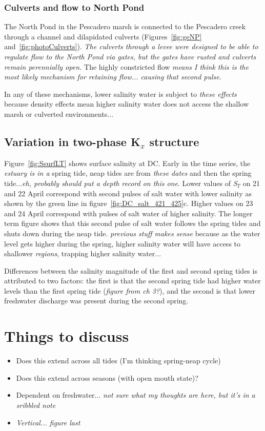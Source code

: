 \subsubsection{Culverts and flow to North Pond}
The North Pond in the Pescadero marsh is connected to the Pescadero creek through a channel and dilapidated culverts (Figures~\ref{fig:geNP} and~\ref{fig:photoCulverts}). \emph{The culverts through a levee were designed to be able to regulate flow to the North Pond via gates, but the gates have rusted and culverts remain perennially open.} The highly constricted flow \emph{means I think this is the most likely mechanism for retaining flow... causing that second pulse}.  

In any of these mechanisms, lower salinity water is subject to \emph{these effects} because density effects mean higher salinity water does not access the shallow marsh or culverted environments... 

\subsection{Variation in two-phase K$_x$ structure}
Figure~\ref{fig:SsurfLT} shows surface salinity at DC. Early in the time series, the \emph{estuary is in a} spring tide, neap tides are from \emph{these dates} and then the spring tide...\emph{eh, probably should put a depth record on this one}. Lower values of \emph{S$_T$} on 21 and 22 April correspond with second pulses of salt water with lower salinity as shown by the green line in figure~\ref{fig:DC_salt_421_425}c. Higher values on 23 and 24 April correspond with pulses of salt water of higher salinity. The longer term figure shows that this second pulse of salt water follows the spring tides and shuts down during the neap tide. \emph{previous stuff makes sense} because as the water level gets higher during the spring, higher salinity water will have access to shallower \emph{regions}, trapping higher salinity water... 

Differences between the salinity magnitude of the first and second spring tides is attributed to two factors: the first is that the second spring tide had higher water levels than the first spring tide (\emph{figure from ch 3?}), and the second is that lower freshwater discharge was present during the second spring. 


\section{Things to discuss}
\begin{itemize}
	\item Does this extend across all tides (I'm thinking spring-neap cycle)
	\item Does this extend across seasons (with open mouth state)?
	\item Dependent on freshwater... \emph{not sure what my thoughts are here, but it's in a sribbled note}
	\item \emph{Vertical... figure last}
\end{itemize}



